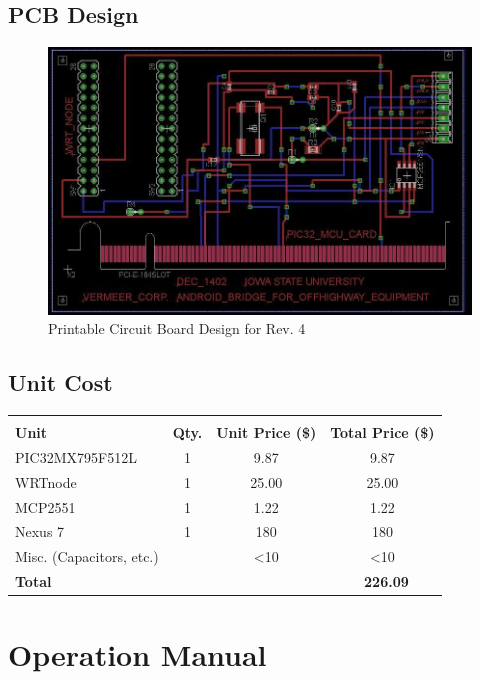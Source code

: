 \documentclass[paper=a4, fontsize=11pt]{scrartcl}
\numberwithin{equation}{section}		%
\numberwithin{figure}{section}			%
\numberwithin{table}{section}				%
\begin{document}
\pagebreak
\subsection{PCB Design}
 \begin{figure}[ht]
	 \center\includegraphics[scale=0.4]{PCB.jpg}
 \caption{Printable Circuit Board Design for Rev. 4}
 \end{figure}

 \vspace{30pt}

 \subsection{Unit Cost}
 \vspace{10pt}
 \begin{center}
 \begin{tabular}{l c c c}
	\hline\\
	 \textbf{Unit} & \textbf{Qty.} & \textbf{Unit Price (\$)} & \textbf{Total Price (\$)} \\ [1ex]
	 PIC32MX795F512L & 1 & 9.87 & 9.87 \\ [1ex]
	 WRTnode & 1 & 25.00 & 25.00 \\ [1ex]
	 MCP2551 & 1 & 1.22 & 1.22 \\ [1ex]
	 Nexus 7 & 1 & 180 & 180 \\ [1ex]
	 Misc. (Capacitors, etc.) & & <10 & <10 \\ [1ex] \cline{4-4}
	 \textbf{Total}&&& \textbf{~226.09} \\ [1ex]
	\hline
\end{tabular}
\end{center}
 

 \pagebreak
 \section{Operation Manual}
\end{document}
